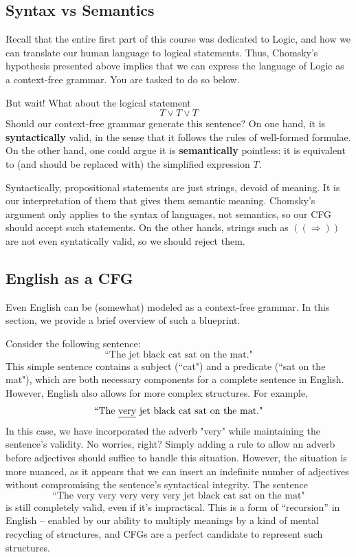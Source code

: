 \documentclass{article}
\begin{document}
\subsection*{Syntax vs Semantics}
    Recall that the entire first part of this course was dedicated to Logic, and how we can translate our human language to logical statements. Thus, Chomsky's hypothesis presented above implies that we can express the language of Logic as a context-free grammar. You are tasked to do so below. 
    

    \vspace{2mm}
    But wait! What about the logical statement $$T \lor T \lor T$$ Should our context-free grammar generate this sentence? On one hand, it is \textbf{syntactically} valid, in the sense that it follows the rules of well-formed formulae. On the other hand, one could argue it is \textbf{semantically} pointless: it is equivalent to (and should be replaced with) the simplified expression $T$.

    \vspace{2mm}
    Syntactically, propositional statements are just strings, devoid of meaning. It is our interpretation of them that gives them semantic meaning. Chomsky's argument only applies to the syntax of languages, not semantics, so our CFG should accept such statements. On the other hands, strings such as $((\Rightarrow))$ are not even syntatically valid, so we should reject them.


\subsection*{English as a CFG}
    Even English can be (somewhat) modeled as a context-free grammar. In this section, we provide a brief overview of such a blueprint.
    
    \vspace{2mm}
    Consider the following sentence:$$\text{``The jet black cat sat on the mat."}$$ This simple sentence contains a subject (``cat") and a predicate (``sat on the mat"), which are both necessary components for a complete sentence in English. However, English also allows for more complex structures. For example, $$\text{``The \underline{very} jet black cat sat on the mat."}$$ In this case, we have incorporated the adverb "very" while maintaining the sentence's validity. No worries, right? Simply adding a rule to allow an adverb before adjectives should suffice to handle this situation. However, the situation is more nuanced, as it appears that we can insert an indefinite number of adjectives without compromising the sentence's syntactical integrity. The sentence $$\text{``The very very very very very jet black cat sat on the mat"}$$ is still completely valid, even if it's impractical. This is a form of “recursion” in English -- enabled by our ability to multiply meanings by a kind of mental recycling of structures, and CFGs are a perfect candidate to represent such structures.
\end{document}
